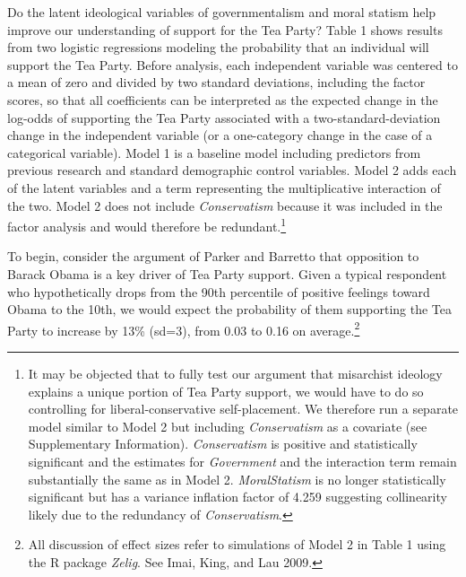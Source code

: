 \documentclass[12pt,]{article}
\begin{document}
Do the latent ideological variables of governmentalism and moral statism
help improve our understanding of support for the Tea Party? Table 1
shows results from two logistic regressions modeling the probability
that an individual will support the Tea Party. Before analysis, each
independent variable was centered to a mean of zero and divided by two
standard deviations, including the factor scores, so that all
coefficients can be interpreted as the expected change in the log-odds
of supporting the Tea Party associated with a two-standard-deviation
change in the independent variable (or a one-category change in the case
of a categorical variable). Model 1 is a baseline model including
predictors from previous research and standard demographic control
variables. Model 2 adds each of the latent variables and a term
representing the multiplicative interaction of the two. Model 2 does not
include \emph{Conservatism} because it was included in the factor
analysis and would therefore be redundant.\footnote{It may be objected
  that to fully test our argument that misarchist ideology explains a
  unique portion of Tea Party support, we would have to do so
  controlling for liberal-conservative self-placement. We therefore run
  a separate model similar to Model 2 but including \emph{Conservatism}
  as a covariate (see Supplementary Information). \emph{Conservatism} is
  positive and statistically significant and the estimates for
  \emph{Government} and the interaction term remain substantially the
  same as in Model 2. \emph{MoralStatism} is no longer statistically
  significant but has a variance inflation factor of 4.259 suggesting
  collinearity likely due to the redundancy of \emph{Conservatism}.}

To begin, consider the argument of Parker and Barretto that opposition
to Barack Obama is a key driver of Tea Party support. Given a typical
respondent who hypothetically drops from the 90th percentile of positive
feelings toward Obama to the 10th, we would expect the probability of
them supporting the Tea Party to increase by 13\% (sd=3), from 0.03 to
0.16 on average.\footnote{All discussion of effect sizes refer to
  simulations of Model 2 in Table 1 using the R package \emph{Zelig}.
  See Imai, King, and Lau 2009.}
\end{document}
